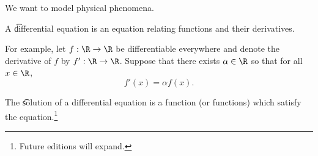 

We want to model physical phenomena.


A \t{differential equation} is an equation relating functions and their derivatives.


For example, let $f: \R \to \R$ be differentiable everywhere and denote the derivative of $f$ by $f': \R \to \R$.
Suppose that there exists $\alpha \in \R$ so that for all $x \in \R$,
\[
  f'(x) = \alpha f(x).
\]


The \t{solution} of a differential equation is a function (or functions) which satisfy the equation.\footnote{Future editions will expand.}

\blankpage
